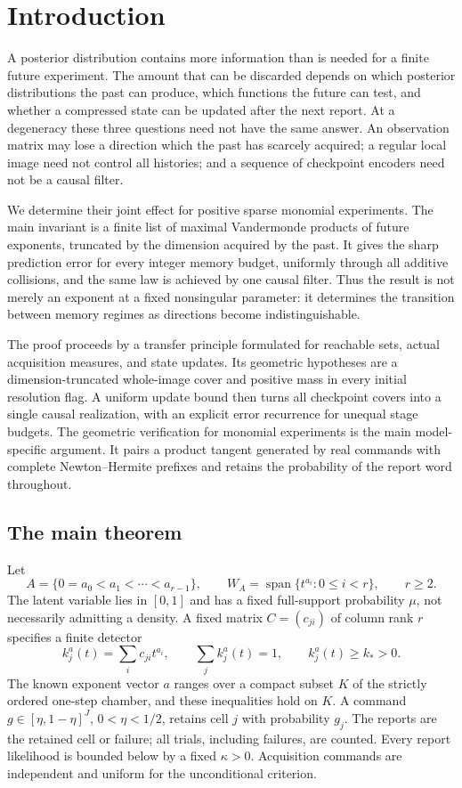 \section{Introduction}
A posterior distribution contains more information than is needed for a
finite future experiment. The amount that can be discarded depends on
which posterior distributions the past can produce, which functions the
future can test, and whether a compressed state can be updated after the
next report. At a degeneracy these three questions need not have the
same answer. An observation matrix may lose a direction which the past
has scarcely acquired; a regular local image need not control all
histories; and a sequence of checkpoint encoders need not be a causal
filter.

We determine their joint effect for positive sparse monomial experiments.
The main invariant is a finite list of maximal Vandermonde products of
future exponents, truncated by the dimension acquired by the past. It
gives the sharp prediction error for every integer memory budget,
uniformly through all additive collisions, and the same law is achieved
by one causal filter. Thus the result is not merely an exponent at a
fixed nonsingular parameter: it determines the transition between
memory regimes as directions become indistinguishable.

The proof proceeds by a transfer principle formulated for reachable
sets, actual acquisition measures, and state updates. Its geometric
hypotheses are a dimension-truncated whole-image cover and positive
mass in every initial resolution flag. A uniform update bound then
turns all checkpoint covers into a single causal realization, with an
explicit error recurrence for unequal stage budgets. The geometric
verification for monomial experiments is the main model-specific
argument. It pairs a product tangent generated by real commands with
complete Newton--Hermite prefixes and retains the probability of the
report word throughout.

\subsection{The main theorem}
Let
\[
 A=\{0=a_0<a_1<\cdots<a_{r-1}\},\qquad
 W_A=\operatorname{span}\{t^{a_i}:0\le i<r\},\qquad r\ge2.
\]
The latent variable lies in $[0,1]$ and has a fixed full-support
probability $\mu$, not necessarily admitting a density. A fixed matrix
$C=(c_{ji})$ of column rank $r$ specifies a finite detector
\[
 k_j^a(t)=\sum_i c_{ji}t^{a_i},\qquad
 \sum_j k_j^a(t)=1,\qquad k_j^a(t)\ge k_*>0.
\]
The known exponent vector $a$ ranges over a compact subset $K$ of the
strictly ordered one-step chamber, and these inequalities hold on $K$.
A command $g\in[\eta,1-\eta]^J$, $0<\eta<1/2$, retains cell $j$
with probability $g_j$. The reports are the retained cell or failure;
all trials, including failures, are counted. Every report likelihood is
bounded below by a fixed $\kappa>0$. Acquisition commands are independent
and uniform for the unconditional criterion.

